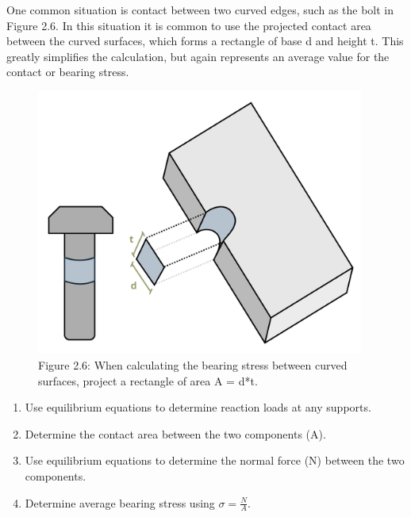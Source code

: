 \documentclass[
  letterpaper,
  DIV=11,
  numbers=noendperiod]{scrreprt}
\begin{document}
One common situation is contact between two curved edges, such as the
bolt in Figure 2.6. In this situation it is common to use the projected
contact area between the curved surfaces, which forms a rectangle of
base d and height t. This greatly simplifies the calculation, but again
represents an average value for the contact or bearing stress.

\begin{figure}[H]

{\centering \includegraphics[width=4.23958in,height=\textheight]{images/CH2 figures/2.6.png}

}

\caption{Figure 2.6: When calculating the bearing stress between curved
surfaces, project a rectangle of area A = d*t.}

\end{figure}%

\begin{tcolorbox}[enhanced jigsaw, breakable, opacityback=0, toptitle=1mm, left=2mm, colback=white, opacitybacktitle=0.6, colframe=quarto-callout-warning-color-frame, titlerule=0mm, arc=.35mm, leftrule=.75mm, bottomtitle=1mm, colbacktitle=quarto-callout-warning-color!10!white, rightrule=.15mm, title={Step-by-step: Bearing Stress}, bottomrule=.15mm, toprule=.15mm, coltitle=black]

\begin{enumerate}
\def\labelenumi{\arabic{enumi}.}
\item
  Use equilibrium equations to determine reaction loads at any supports.
\item
  Determine the contact area between the two components (A).
\item
  Use equilibrium equations to determine the normal force (N) between
  the two components.
\item
  Determine average bearing stress using \(\sigma=\frac{N}{A}\).
\end{enumerate}

\end{tcolorbox}
\end{document}
